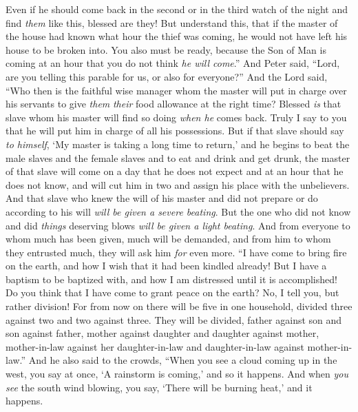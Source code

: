 \begin{biblechapter}
\verse Even if he should come back in the second or in the third watch of the night and find \textit{them} like this, blessed are they!
\verse But understand this, that if the master of the house had known what hour the thief was coming, he would not have left his house to be broken into.
\verse You also must be ready, because the Son of Man is coming at an hour that you do not think \textit{he will come}.”
 And Peter said, “Lord, are you telling this parable for us, or also for everyone?”
\verse And the Lord said, “Who then is the faithful wise manager whom the master will put in charge over his servants to give \textit{them} \textit{their} food allowance at the right time?
\verse Blessed \textit{is} that slave whom his master will find so doing \textit{when he} comes back.
\verse Truly I say to you that he will put him in charge of all his possessions.
\verse But if that slave should say \textit{to himself}, ‘My master is taking a long time to return,’ and he begins to beat the male slaves and the female slaves and to eat and drink and get drunk,
\verse the master of that slave will come on a day that he does not expect and at an hour that he does not know, and will cut him in two and assign his place with the unbelievers.
\verse And that slave who knew the will of his master and did not prepare or do according to his will \textit{will be given a severe beating}.
\verse But the one who did not know and did \textit{things} deserving blows \textit{will be given a light beating}. And from everyone to whom much has been given, much will be demanded, and from him to whom they entrusted much, they will ask him \textit{for} even more.
 “I have come to bring fire on the earth, and how I wish that it had been kindled already!
\verse But I have a baptism to be baptized with, and how I am distressed until it is accomplished!
\verse Do you think that I have come to grant peace on the earth? No, I tell you, but rather division!
\verse For from now on there will be five in one household, divided three against two and two against three.
\verse They will be divided, father against son and son against father, mother against daughter and daughter against mother, mother-in-law against her daughter-in-law and daughter-in-law against mother-in-law.”
 And he also said to the crowds, “When you see a cloud coming up in the west, you say at once, ‘A rainstorm is coming,’ and so it happens.
\verse And when \textit{you see} the south wind blowing, you say, ‘There will be burning heat,’ and it happens.

\end{biblechapter}
